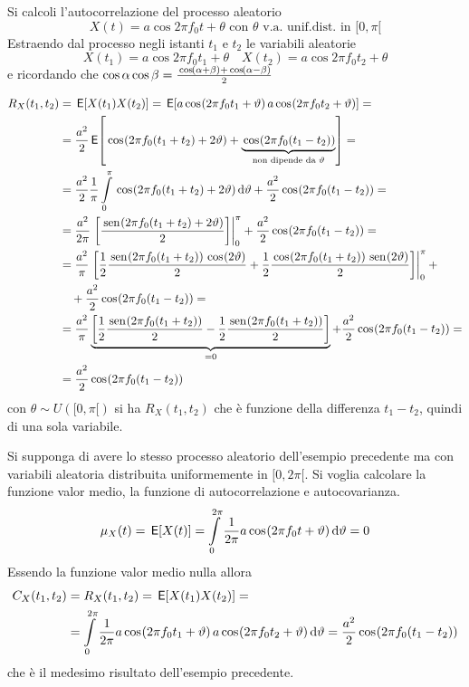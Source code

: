 \begin{esempio}
\label{es:oscillatore_non_stazionario}
Si calcoli l'autocorrelazione del processo aleatorio
\[
	X(t)=a\cos{2\pi f_0 t+\theta}\text{ con }\theta\text{ v.a. unif.dist. in }[0,\pi[
\]
Estraendo dal processo negli istanti $t_1$ e $t_2$ le variabili aleatorie
\[
	X(t_1)=a\cos{2\pi f_0 t_1+\theta}\quad X(t_2)=a\cos{2\pi f_0 t_2+\theta}
\]
e ricordando che $\operatorname{cos}\alpha\operatorname{cos}\beta=\frac{\,{\operatorname{cos}}^{}\!\left({\alpha+\beta}\right)+\,{\operatorname{cos}}^{}\!\left({\alpha-\beta}\right)}{2}$

\begin{equation}
\label{eq:autocorrelazione_oscillatore_non_stazionario}
	\begin{split}
		R_X(t_1,t_2)&=\E{X(t_1)X(t_2)}=\E{a\cos{2\pi f_0 t_1+\theta}a\cos{2\pi f_0 t_2+\theta}}=\\
		&=\frac{a^2}{2}\E{\cos{2\pi f_0(t_1+t_2)+2\theta}+\underbrace{\cos{2\pi f_0(t_1-t_2)}}_{\text{non dipende da $\theta$}}}=\\
		&=\frac{a^2}{2}\frac{1}{\pi}\intd{0}{\pi}{\cos{2\pi f_0(t_1+t_2)+2\theta}}{\theta}+\frac{a^2}{2}\cos{2\pi f_0(t_1-t_2)}=\\
		&=\frac{a^2}{2\pi}\bound{0}{\pi}{\frac{\sen{2\pi f_0(t_1+t_2)+2\theta}}{2}}+\frac{a^2}{2}\cos{2\pi f_0(t_1-t_2)}=\\
		&=\frac{a^2}{\pi}\bound{0}{\pi}{\frac{1}{2}\frac{\sen{2\pi f_0(t_1+t_2)}\cos{2\theta}}{2}+\frac{1}{2}\frac{\cos{2\pi f_0(t_1+t_2)}\sen{2\theta}}{2}}+\\
		&\quad+\frac{a^2}{2}\cos{2\pi f_0(t_1-t_2)}=\\
		&=\frac{a^2}{\pi}\underbrace{\left[\frac{1}{2}\frac{\sen{2\pi f_0(t_1+t_2)}}{2}-\frac{1}{2}\frac{\sen{2\pi f_0(t_1+t_2)}}{2}\right]}_{=0}+\frac{a^2}{2}\cos{2\pi f_0(t_1-t_2)}=\\
		&=\frac{a^2}{2}\cos{2\pi f_0(t_1-t_2)}
	\end{split}
\end{equation}
con $\theta\sim U([0,\pi[)$ si ha $R_X(t_1,t_2)$ che è funzione della differenza $t_1-t_2$, quindi di una sola variabile.
\end{esempio}
\begin{esempio}
\label{es:oscillatore_stazionario}
Si supponga di avere lo stesso processo aleatorio dell'esempio precedente ma con variabili aleatoria distribuita uniformemente in $[0,2\pi[$. Si voglia calcolare la funzione valor medio, la funzione di autocorrelazione e autocovarianza.
\[
	\mu_X(t)=\,{\operatorname{\mathsf{E}}}\!\left[{X(t)}\right]=\int\limits_{0}^{2\pi}{\frac{1}{2\pi}a\,{\operatorname{cos}}^{}\!\left({2\pi f_0 t+\vartheta}\right)}{\,\mathop{}\!\mathrm{d}{\vartheta}}=0
\]
Essendo la funzione valor medio nulla allora
\begin{equation}
\label{eq:autocorrelazione_oscillatore_stazionario}
	\begin{split}
		C_X(t_1,t_2)&=R_X(t_1,t_2)=\,{\operatorname{\mathsf{E}}}\!\left[{X(t_1)X(t_2)}\right]=\\
		&=\int\limits_{0}^{2\pi}{\frac{1}{2\pi}a\,{\operatorname{cos}}^{}\!\left({2\pi f_0 t_1+\vartheta}\right)a\,{\operatorname{cos}}^{}\!\left({2\pi f_0 t_2+\vartheta}\right)}{\,\mathop{}\!\mathrm{d}{\vartheta}}=\frac{a^2}{2}\,{\operatorname{cos}}^{}\!\left({2\pi f_0(t_1-t_2)}\right)
	\end{split}
\end{equation}
che è il medesimo risultato dell'esempio precedente.
\end{esempio}

